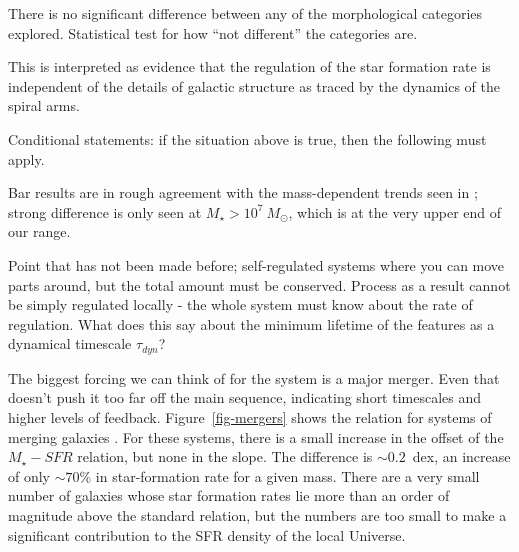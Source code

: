 \documentclass{emulateapj}
\begin{document}
There is no significant difference between any of the morphological categories explored. Statistical test for how ``not different'' the categories are. 

This is interpreted as evidence that the regulation of the star formation rate is independent of the details of galactic structure as traced by the dynamics of the spiral arms. 

Conditional statements: if the situation above is true, then the following must apply. 

Bar results are in rough agreement with the mass-dependent trends seen in \citet{ell11}; strong difference is only seen at $M_\star>10^7~M_\odot$, which is at the very upper end of our range.

Point that has not been made before; self-regulated systems where you can move parts around, but the total amount must be conserved. Process as a result cannot be simply regulated locally - the whole system must know about the rate of regulation. What does this say about the minimum lifetime of the features as a dynamical timescale $\tau_{dyn}$? 

The biggest forcing we can think of for the system is a major merger. Even that doesn't push it too far off the main sequence, indicating short timescales and higher levels of feedback. Figure~\ref{fig-mergers} shows the relation for systems of merging galaxies \citep{dar10a}. For these systems, there is a small increase in the offset of the $M_\star-SFR$ relation, but none in the slope. The difference is $\sim0.2$~dex, an increase of only $\sim70\%$ in star-formation rate for a given mass. There are a very small number of galaxies whose star formation rates lie more than an order of magnitude above the standard relation, but the numbers are too small to make a significant contribution to the SFR density of the local Universe. 
\end{document}
